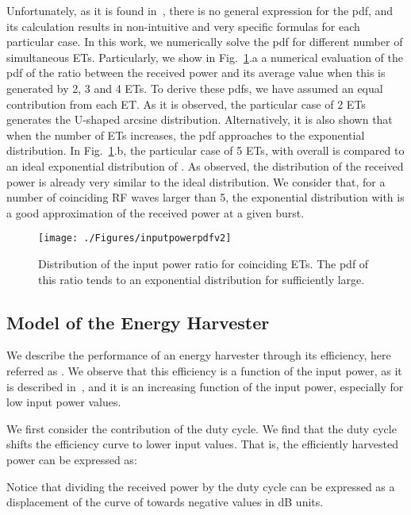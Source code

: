 \documentclass[conference]{IEEEtran}
\begin{document}
Unfortunately, as it is found in~\cite{sum_of_sines}, there is no general expression for the pdf, and its calculation results in non-intuitive and very specific formulas for each particular case. In this work, we numerically solve the pdf for different number of simultaneous ETs. Particularly, we show in Fig.~\ref{fig:inputpowerpdf}.a a numerical evaluation of the pdf of the ratio between the received power and its average value when this is generated by 2, 3 and 4 ETs. To derive these pdfs, we have assumed an equal contribution from each ET. As it is observed, the particular case of 2 ETs generates the U-shaped arcsine distribution. Alternatively, it is also shown that when the number of ETs increases, the pdf approaches to the exponential distribution. In Fig.~\ref{fig:inputpowerpdf}.b, the particular case of 5 ETs, with overall  is compared to an ideal exponential distribution of . As observed, the distribution of the received power is already very similar to the ideal distribution. We consider that, for a number of coinciding RF waves larger than 5, the exponential distribution with  is a good approximation of the received power at a given burst.

\begin{figure}
  \centering
    \texttt{[image: ./Figures/inputpowerpdfv2]}
 \caption{Distribution of the input power ratio for  coinciding ETs. The pdf of this ratio tends to an exponential distribution for  sufficiently large.}
 \label{fig:inputpowerpdf}
 \vspace{0.0 cm}
\end{figure}

\subsection{Model of the Energy Harvester}
We describe the performance of an energy harvester through its efficiency, here referred as . We observe that this efficiency is a function of the input power, as it is described in~\cite{P1110,kaushik-jetcas}, and it is an increasing function of the input power, especially for low input power values. 

We first consider the contribution of the duty cycle. We find that the duty cycle shifts the efficiency curve to lower input values. That is, the efficiently harvested power  can be expressed as:

Notice that dividing the received power by the duty cycle can be expressed as a displacement of the curve of  towards negative values in dB units.
\end{document}
